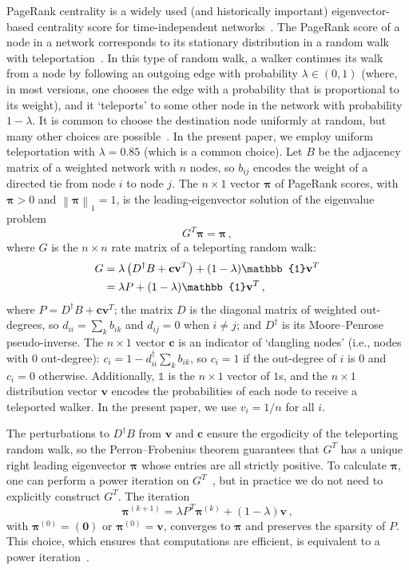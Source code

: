 \documentclass[journal,transmag]{IEEEtran}
\newcommand{\gvec}[1]{\bm{#1}}
\newcommand{\vecb}[1]{\mathbf{#1}}
\newcommand{\norm}[1]{\left\| #1 \right\|}
\newcommand{\vpi}{\gvec{\pi}}
\begin{document}
PageRank centrality is a widely used (and historically important)
eigenvector-based centrality score for time-independent
networks~\cite{Page1998,newman2010networks}. The PageRank score of a
node in a network corresponds to its stationary distribution in a
random walk with teleportation~\cite{Gleich2015, Masuda2016}. In this type of random
walk, a walker continues its walk from a node by following an outgoing edge with
probability $\lambda\in (0,1)$ (where, in most versions, one chooses
the edge with a probability that is proportional to its weight), and
it `teleports' to some other node in the network with probability
$1-\lambda$. It is common to choose the destination node uniformly at
random, but many other choices are
possible~\cite{Lambiotte2012,Gleich2015}. In the present paper, we
employ uniform teleportation with $\lambda=0.85$ (which is a
common choice). Let $B$ be the adjacency matrix of a weighted network
with $n$ nodes, so $b_{ij}$ encodes the weight of a directed tie from
node $i$ to node $j$.  The $n\times 1$ vector $\vpi$ of PageRank
scores, with $\vpi > 0$ and $\norm{\vpi}_1 = 1$, is the
leading-eigenvector solution of the eigenvalue problem
\begin{equation}
	  G^T\vpi = \vpi\,,
  \label{eq:evecG}
\end{equation}
where $G$ is the $n \times n$ rate matrix of a teleporting random
walk:
\begin{align}
 	 G & = \lambda \left(D^\dagger B  + \vecb{c}\vecb{v}^T\right)
  + (1-\lambda)\mathbb{1}\vecb{v}^T \label{eq:G} \\
  & = \lambda P + (1-\lambda) \mathbb{1}\vecb{v}^T\,, \notag
\end{align}
where $P= D^\dagger B + \vecb{c}\vecb{v}^T$; the matrix $D$ is the
diagonal matrix of weighted out-degrees, so $d_{ii}=\sum_k b_{ik}$ and
$d_{ij}=0$ when $i\neq j$; and $D^\dagger$ is its Moore--Penrose
pseudo-inverse.  The $n \times 1$ vector $\vecb{c}$ is an indicator of
`dangling nodes' (i.e., nodes with $0$ out-degree): $c_i =1-
d^\dagger_{ii}\sum_k b_{ik}$, so $c_i=1$ if the out-degree of $i$ is
$0$ and $c_i=0$ otherwise. Additionally, $\mathbb{1}$ is the $n\times
1$ vector of $1$s, and the $n \times 1$ distribution vector $\vecb{v}$
encodes the probabilities of each node to receive a teleported
walker. In the present paper, we use $v_i={1}/{n}$ for all $i$.

The perturbations to $D^\dagger B$ from $\vecb{v}$ and $\vecb{c}$
ensure the ergodicity of the teleporting random walk,
so the  Perron--Frobenius theorem guarantees that
  $G^T$ has a unique right leading eigenvector
$\vpi$ whose entries are all
strictly positive. To calculate
$\vpi$, one can perform a power iteration on
$G^T$~\cite{Trefethen1997}, but in practice we do not need to
explicitly construct $G^T$. The iteration
\begin{equation}
	  \vpi^{\left(k+1\right)} = \lambda P^T\vpi^{\left(k\right)} + (1-\lambda)\vecb{v}\,,
  \label{eq:iter_pr}
\end{equation}
with $\vpi^{\left(0\right)}=\vecb{\left(0\right)}$ or
$\vpi^{\left(0\right)}=\vecb{v}$, converges to $\vpi$ and preserves
the sparsity of $P$. This choice, which ensures that computations are
efficient, is equivalent to a power iteration~\cite{Gleich2015}.
\end{document}
